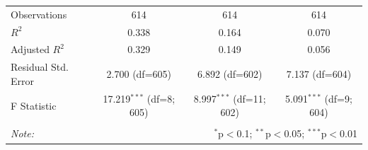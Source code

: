 \begin{table}[!htbp]
\begin{tabular}{@{\extracolsep{5pt}}lccc}
 Observations & 614 & 614 & 614 \\
 $R^2$ & 0.338 & 0.164 & 0.070 \\
 Adjusted $R^2$ & 0.329 & 0.149 & 0.056 \\
 Residual Std. Error & 2.700 (df=605) & 6.892 (df=602) & 7.137 (df=604) \\
 F Statistic & 17.219$^{***}$ (df=8; 605) & 8.997$^{***}$ (df=11; 602) & 5.091$^{***}$ (df=9; 604) \\
\hline
\hline \\[-1.8ex]
\textit{Note:} & \multicolumn{3}{r}{$^{*}$p$<$0.1; $^{**}$p$<$0.05; $^{***}$p$<$0.01} \\
\end{tabular}
\end{table}